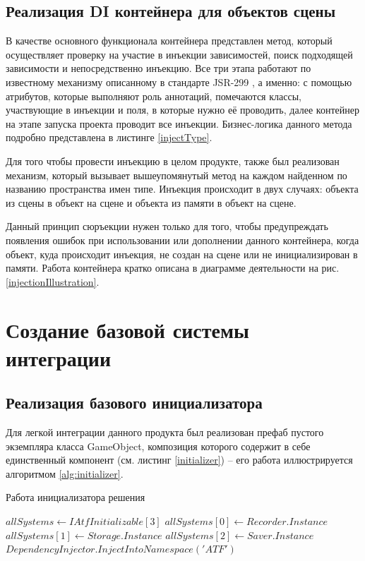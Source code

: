 \subsection{Реализация DI контейнера для объектов сцены}
В качестве основного функционала контейнера представлен метод, который осуществляет проверку на участие в инъекции зависимостей, поиск подходящей зависимости и непосредственно инъекцию. Все три этапа работают по известному механизму описанному в стандарте JSR-299 \cite{jsr}, а именно: с помощью атрибутов, которые выполняют роль аннотаций, помечаются классы, участвующие в инъекции и поля, в которые нужно её проводить, далее контейнер на этапе запуска проекта проводит все инъекции. Бизнес-логика данного метода подробно представлена в листинге \ref{injectType}.

Для того чтобы провести инъекцию в целом продукте, также был реализован механизм, который вызывает вышеупомянутый метод на каждом найденном по названию пространства имен типе. Инъекция происходит в двух случаях: объекта из сцены в объект на сцене и объекта из памяти в объект на сцене. 

Данный принцип сюръекции нужен только для того, чтобы предупреждать появления ошибок при использовании или дополнении данного контейнера, когда объект, куда происходит инъекция, не создан на сцене или не инициализирован в памяти. Работа контейнера кратко описана в диаграмме деятельности на рис. \ref{injectionIllustration}.

\section{Создание базовой системы интеграции}
\subsection{Реализация базового инициализатора}
Для легкой интеграции данного продукта был реализован префаб пустого экземпляра класса GameObject, композиция которого содержит в себе единственный компонент (см. листинг \ref{initializer}) -- его работа  иллюстрируется алгоритмом \ref{alg:initializer}. 

\begin{algorithm}
	\caption{Работа инициализатора решения}\label{alg:initializer}
	\begin{algorithmic}
		\State $allSystems \gets IAtfInitializable[3]$
		\State $allSystems[0] \gets Recorder.Instance$
		\State $allSystems[1] \gets Storage.Instance$
		\State $allSystems[2] \gets Saver.Instance$
		  \EndFor
		\State $DependencyInjector.InjectIntoNamespace('ATF')$
	\end{algorithmic}
\end{algorithm}

